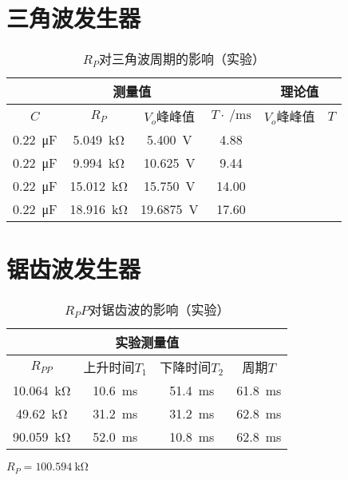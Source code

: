 \documentclass[UTF8]{ctexart}
\numberwithin{figure}{subsection}
\numberwithin{table}{subsection}
\numberwithin{equation}{subsection}
\begin{document}
\section{三角波发生器}
\begin{table}[h]
    \begin{center}
        \caption{\(R_P\)对三角波周期的影响（实验）}
        \begin{tabular}{|c|c|c|c|c|c|}
            \hline
            \multicolumn{4}{|c|}{测量值} & \multicolumn{2}{c|}{理论值} \\
            \hline
            \(C\) & \(R_P\) & \(V_o\)峰峰值 & \(T\cdot\SI{}{\per\milli\second}\) & \(V_o\)峰峰值 & \(T\) \\
            \hline
            \SI{0.22}{\micro\farad} & \SI{5.049}{\kilo\ohm} & \SI{5.400}{\volt} & 4.88 & & \\
            \hline
            \SI{0.22}{\micro\farad} & \SI{9.994}{\kilo\ohm} & \SI{10.625}{\volt} & 9.44 & & \\
            \hline
            \SI{0.22}{\micro\farad} & \SI{15.012}{\kilo\ohm} & \SI{15.750}{\volt} & 14.00 & & \\
            \hline
            \SI{0.22}{\micro\farad} & \SI{18.916}{\kilo\ohm} & \SI{19.6875}{\volt} & 17.60 & & \\
            \hline
        \end{tabular}
    \end{center}
    \label{triangular wave f exp data}
\end{table}


\section{锯齿波发生器}
\begin{table}[h]
    \begin{center}
        \caption{\(R_PP\)对锯齿波的影响（实验）}
        \begin{tabular}{|c|c|c|c|}
            \hline
            \multicolumn{4}{|c|}{实验测量值} \\
            \hline
            \(R_{PP}\)  & 上升时间\(T_1\) & 下降时间\(T_2\) & 周期\(T\)\\
            \hline
            \SI{10.064}{\kilo\ohm} & \SI{10.6}{\milli\second} & \SI{51.4}{\milli\second} & \SI{61.8}{\milli\second} \\
            \hline
            \SI{49.62}{\kilo\ohm} & \SI{31.2}{\milli\second} & \SI{31.2}{\milli\second} & \SI{62.8}{\milli\second} \\
            \hline
            \SI{90.059}{\kilo\ohm} & \SI{52.0}{\milli\second} & \SI{10.8}{\milli\second} & \SI{62.8}{\milli\second} \\
            \hline
            
        \end{tabular}
        \par \(R_P = \SI{100.594}{\kilo\ohm}\)
    \end{center}
    \label{sawtooth wave f exp data}
\end{table}
\end{document}
